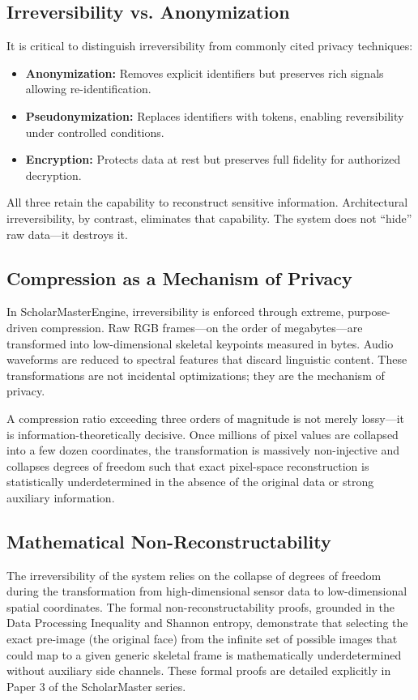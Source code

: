 \documentclass[conference]{IEEEtran}
\begin{document}
\subsection{Irreversibility vs. Anonymization}
It is critical to distinguish irreversibility from commonly cited privacy techniques:
\begin{itemize}
    \item \textbf{Anonymization:} Removes explicit identifiers but preserves rich signals allowing re-identification.
    \item \textbf{Pseudonymization:} Replaces identifiers with tokens, enabling reversibility under controlled conditions.
    \item \textbf{Encryption:} Protects data at rest but preserves full fidelity for authorized decryption.
\end{itemize}
All three retain the capability to reconstruct sensitive information. Architectural irreversibility, by contrast, eliminates that capability. The system does not ``hide'' raw data---it destroys it.

\subsection{Compression as a Mechanism of Privacy}
In ScholarMasterEngine, irreversibility is enforced through extreme, purpose-driven compression. Raw RGB frames---on the order of megabytes---are transformed into low-dimensional skeletal keypoints measured in bytes. Audio waveforms are reduced to spectral features that discard linguistic content. These transformations are not incidental optimizations; they are the mechanism of privacy.

A compression ratio exceeding three orders of magnitude is not merely lossy---it is information-theoretically decisive. Once millions of pixel values are collapsed into a few dozen coordinates, the transformation is massively non-injective and collapses degrees of freedom such that exact pixel-space reconstruction is statistically underdetermined in the absence of the original data or strong auxiliary information. 

\subsection{Mathematical Non-Reconstructability}
The irreversibility of the system relies on the collapse of degrees of freedom during the transformation from high-dimensional sensor data to low-dimensional spatial coordinates. The formal non-reconstructability proofs, grounded in the Data Processing Inequality and Shannon entropy, demonstrate that selecting the exact pre-image (the original face) from the infinite set of possible images that could map to a given generic skeletal frame is mathematically underdetermined without auxiliary side channels. These formal proofs are detailed explicitly in Paper 3 of the ScholarMaster series. 
\end{document}

